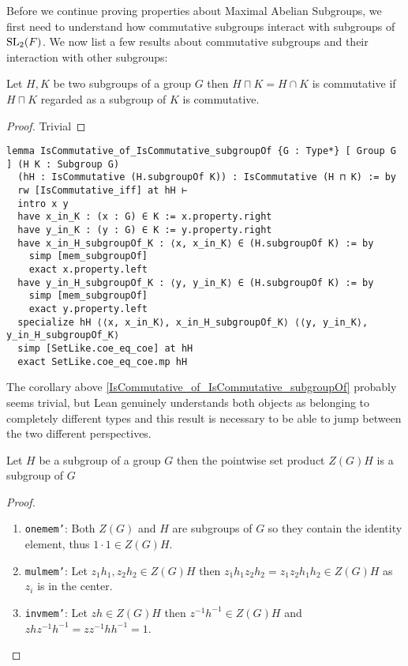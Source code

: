 Before we continue proving properties about Maximal Abelian Subgroups, we first need to understand how commutative subgroups interact with subgroups of $\operatorname{SL}_2(F)$. 
We now list a few results about commutative subgroups and their interaction with other subgroups:

\begin{corollary}
\label{IsCommutative_of_IsCommutative_subgroupOf}
\leanok
Let $H, K$ be two subgroups of a group $G$ then $H \sqcap K = H \cap K$ is commutative if $H \sqcap K$ regarded as a subgroup of $K$ is commutative.
\end{corollary}
\begin{proof}
  \leanok
Trivial
\end{proof}
\begin{footnotesize}
\begin{verbatim}
lemma IsCommutative_of_IsCommutative_subgroupOf {G : Type*} [ Group G ] (H K : Subgroup G)
  (hH : IsCommutative (H.subgroupOf K)) : IsCommutative (H ⊓ K) := by
  rw [IsCommutative_iff] at hH ⊢
  intro x y
  have x_in_K : (x : G) ∈ K := x.property.right
  have y_in_K : (y : G) ∈ K := y.property.right
  have x_in_H_subgroupOf_K : ⟨x, x_in_K⟩ ∈ (H.subgroupOf K) := by
    simp [mem_subgroupOf]
    exact x.property.left
  have y_in_H_subgroupOf_K : ⟨y, y_in_K⟩ ∈ (H.subgroupOf K) := by
    simp [mem_subgroupOf]
    exact y.property.left
  specialize hH ⟨⟨x, x_in_K⟩, x_in_H_subgroupOf_K⟩ ⟨⟨y, y_in_K⟩, y_in_H_subgroupOf_K⟩
  simp [SetLike.coe_eq_coe] at hH
  exact SetLike.coe_eq_coe.mp hH
\end{verbatim}
\end{footnotesize}

\begin{remark}
  The corollary above \ref{IsCommutative_of_IsCommutative_subgroupOf} probably seems trivial, but Lean genuinely understands both objects as belonging to completely different types and 
  this result is necessary to be able to jump between the two different perspectives.
\end{remark}

\begin{lemma}
  \label{center_mul}
  \leanok
  Let $H$ be a subgroup of a group $G$ then the pointwise set product $Z(G) H$ is a subgroup of $G$
\end{lemma}
\begin{proof}
\leanok
\begin{enumerate}
  \item \texttt{one\textunderscore mem'}: Both $Z(G)$ and $H$ are subgroups of $G$ so they contain the identity element, thus $1 \cdot 1 \in Z(G) H$.
  \item \texttt{mul\textunderscore mem'}: Let $z_1 h_1, z_2 h_2 \in Z(G) H$ then $z_1h_1z_2h_2 = z_1z_2 h_1h_2 \in Z(G) H$ as $z_i$ is in the center.
  \item \texttt{inv\textunderscore mem'}: Let $zh \in Z(G) H$ then $z^{-1} h^{-1} \in Z(G) H$ and $z h z^{-1} h^{-1} = zz^{-1}h h^{-1} = 1$.
\end{enumerate}
\end{proof}

